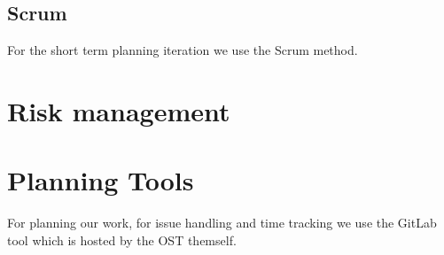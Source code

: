 \subsection{Scrum}
For the short term planning iteration we use the Scrum method.

\section{Risk management}


\section{Planning Tools}
For planning our work, for issue handling and time tracking we use the GitLab tool which is hosted by the OST themself.
